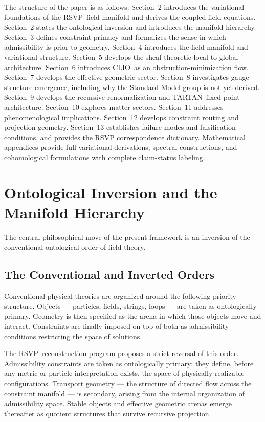 \documentclass[12pt,a4paper]{article}
\newcommand{\RSVP}{\textrm{RSVP}}
\newcommand{\CLIO}{\textrm{CLIO}}
\newcommand{\TARTAN}{\textrm{TARTAN}}
\begin{document}
The structure of the paper is as follows. Section~2 introduces the variational
foundations of the \RSVP\ field manifold and derives the coupled field equations.
Section~2 states the ontological inversion and introduces the manifold
hierarchy. Section~3 defines constraint primacy and formalizes the sense in
which admissibility is prior to geometry. Section~4 introduces the field
manifold and variational structure. Section~5 develops the sheaf-theoretic
local-to-global architecture. Section~6 introduces \CLIO\ as an
obstruction-minimization flow. Section~7 develops the effective geometric sector.
Section~8 investigates gauge structure emergence, including why the Standard Model
group is not yet derived. Section~9 develops the recursive renormalization and
\TARTAN\ fixed-point architecture. Section~10 explores matter sectors. Section~11
addresses phenomenological implications. Section~12 develops constraint routing
and projection geometry. Section~13 establishes failure modes and falsification
conditions, and provides the RSVP correspondence dictionary. Mathematical
appendices provide full variational derivations, spectral constructions, and
cohomological formulations with complete claim-status labeling.

\section{Ontological Inversion and the Manifold Hierarchy}

The central philosophical move of the present framework is an inversion of the
conventional ontological order of field theory.

\subsection{The Conventional and Inverted Orders}

Conventional physical theories are organized around the following priority
structure. Objects --- particles, fields, strings, loops --- are taken as
ontologically primary. Geometry is then specified as the arena in which those
objects move and interact. Constraints are finally imposed on top of both as
admissibility conditions restricting the space of solutions.

The \RSVP\ reconstruction program proposes a strict reversal of this order.
Admissibility constraints are taken as ontologically primary: they define, before
any metric or particle interpretation exists, the space of physically realizable
configurations. Transport geometry --- the structure of directed flow across the
constraint manifold --- is secondary, arising from the internal organization of
admissibility space. Stable objects and effective geometric arenas emerge
thereafter as quotient structures that survive recursive projection.
\end{document}
